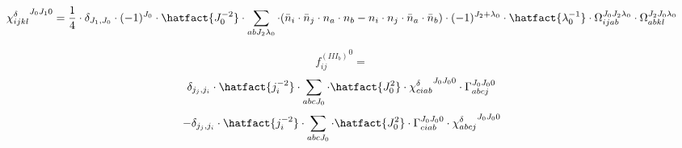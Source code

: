 
\begin{dmath*}
{\chi^{\delta}_{i j k l}}^{{J}_{0} {J}_{1} 0} = \frac{1}{4} \cdot \delta_{{J}_{1},{J}_{0}} \cdot (-1)^{{J}_{0}} \cdot \hatfact{{J}_{0}^{-2}} \cdot \sum_{a b {J}_{2} {{\lambda}}_{0}} \cdot (\bar{n}_{i} \cdot \bar{n}_{j} \cdot n_{a} \cdot n_{b} -n_{i} \cdot n_{j} \cdot \bar{n}_{a} \cdot \bar{n}_{b}) \cdot (-1)^{{J}_{2}+{{\lambda}}_{0}} \cdot \hatfact{{{\lambda}}_{0}^{-1}} \cdot \Omega_{i j a b}^{{J}_{0} {J}_{2} {{\lambda}}_{0}} \cdot \Omega_{a b k l}^{{J}_{2} {J}_{0} {{\lambda}}_{0}}
\end{dmath*}

\begin{dmath*}
{f^{(III_b)}_{i j}}^{0} = 
\end{dmath*}
\begin{dmath*}
\delta_{{j}_{j},{j}_{i}} \cdot \hatfact{{j}_{i}^{-2}} \cdot \sum_{a b c {J}_{0}} \cdot \hatfact{{J}_{0}^{2}} \cdot {\chi^{\delta}_{c i a b}}^{{J}_{0} {J}_{0} 0} \cdot \Gamma_{a b c j}^{{J}_{0} {J}_{0} 0}
\end{dmath*}
\begin{dmath*}
-\delta_{{j}_{j},{j}_{i}} \cdot \hatfact{{j}_{i}^{-2}} \cdot \sum_{a b c {J}_{0}} \cdot \hatfact{{J}_{0}^{2}} \cdot \Gamma_{c i a b}^{{J}_{0} {J}_{0} 0} \cdot {\chi^{\delta}_{a b c j}}^{{J}_{0} {J}_{0} 0}
\end{dmath*}

